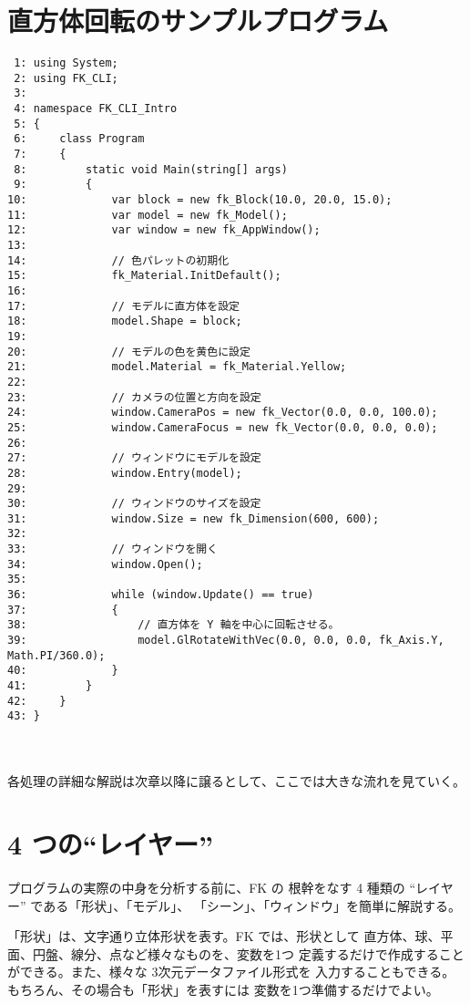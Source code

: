 \section{直方体回転のサンプルプログラム}
\begin{breakbox}
\begin{small}
\begin{verbatim}
 1: using System;
 2: using FK_CLI;
 3: 
 4: namespace FK_CLI_Intro
 5: {
 6:     class Program
 7:     {
 8:         static void Main(string[] args)
 9:         {
10:             var block = new fk_Block(10.0, 20.0, 15.0);
11:             var model = new fk_Model();
12:             var window = new fk_AppWindow();
13: 
14:             // 色パレットの初期化
15:             fk_Material.InitDefault();
16: 
17:             // モデルに直方体を設定
18:             model.Shape = block;
19: 
20:             // モデルの色を黄色に設定
21:             model.Material = fk_Material.Yellow;
22: 
23:             // カメラの位置と方向を設定
24:             window.CameraPos = new fk_Vector(0.0, 0.0, 100.0);
25:             window.CameraFocus = new fk_Vector(0.0, 0.0, 0.0);
26: 
27:             // ウィンドウにモデルを設定
28:             window.Entry(model);
29: 
30:             // ウィンドウのサイズを設定
31:             window.Size = new fk_Dimension(600, 600);
32: 
33:             // ウィンドウを開く
34:             window.Open();
35: 
36:             while (window.Update() == true)
37:             {
38:                 // 直方体を Y 軸を中心に回転させる。
39:                 model.GlRotateWithVec(0.0, 0.0, 0.0, fk_Axis.Y, Math.PI/360.0);
40:             }
41:         }
42:     }
43: }
\end{verbatim}
\end{small}
\end{breakbox}

~ \\ ~ \\
各処理の詳細な解説は次章以降に譲るとして、ここでは大きな流れを見ていく。

\section{4 つの``レイヤー''}
プログラムの実際の中身を分析する前に、FK の
根幹をなす 4 種類の ``レイヤー'' である「形状」、「モデル」、
「シーン」、「ウィンドウ」を簡単に解説する。

「形状」は、文字通り立体形状を表す。FK では、形状として
直方体、球、平面、円盤、線分、点など様々なものを、変数を1つ
定義するだけで作成することができる。また、様々な 3次元データファイル形式を
入力することもできる。もちろん、その場合も「形状」を表すには
変数を1つ準備するだけでよい。

